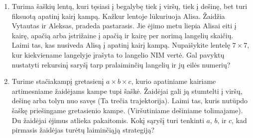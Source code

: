 \begin{enumerate}

  \item Turima šaškių lentą, kuri tęsiasi į begalybę tiek į viršų, tiek į dešinę,
    bet turi fiksuotą apatinį kairį kampą. Kažkur lentoje lūkuriuoja Alisa.
    Žaidžia Vytautas ir Aleksas, pradeda pastarasis. Jie ėjimo metu liepia Alisai
    eiti į kairę, apačią arba įstrižaine į apačią ir kairę per norimą langelių
    skaičių. Laimi tas, kas nusiveda Alisą į apatinį kairį kampą. Nupaišykite
    lentelę $7\times 7$, kur kiekviename langelyje įrašyta to langelio NIM vertė.
    Gal pavyktų nustatyti rekursinį saryšį tarp pralaiminčių langelių ir jų eilės
    numerių? 

  \item Turime stačiakampį gretasienį  $a\times b\times c$, kurio apatiniame
    kairiame artimesniame žaidėjams kampe tupi šaškė. Žaidėjai gali ją stumtelti
    į viršų, dešinę arba tolyn nuo savęs (Ta trečia trajektorija). Laimi tas,
    kuris nutūpdo šaškę priešingame gretasienio kampe. (Viršutiniame dešiniame
    tolimajame). Du žaidėjai ėjimus atlieka pakaitomis. Kokį sąryšį turi tenkinti
    $a$, $b$, ir $c$, kad pirmasis žaidėjas turėtų laiminčiąją strategiją?


\end{enumerate}
